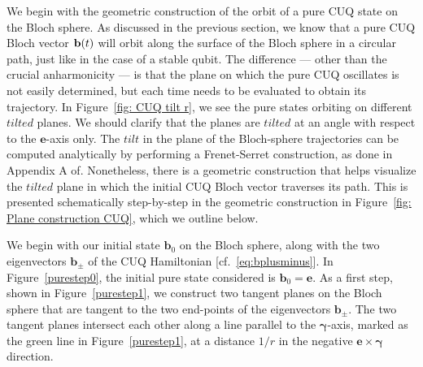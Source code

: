 \documentclass[12pt,a4paper]{article}
\begin{document}
We begin with the geometric construction of the orbit of a pure CUQ state on the Bloch sphere. As discussed in the previous section, we know that a pure CUQ Bloch vector ${\bf b}(t)$ will orbit along the surface of the Bloch sphere in a circular path, just like in the case of a stable qubit. The difference — other than the crucial anharmonicity — is that the plane on which the pure CUQ oscillates is not easily determined, but each time needs to be evaluated to obtain its trajectory. In Figure~\ref{fig: CUQ tilt r}, we see the pure states orbiting on different $\textit{tilted}$ planes. We should clarify that the planes are $\textit{tilted}$ at an angle with respect to the $\mathbf{e}$-axis only. The $\textit{tilt}$ in the plane of the Bloch-sphere trajectories can be computed analytically by performing a Frenet-Serret construction, as done in Appendix A of\cite{Karamitros:2025azy}. Nonetheless, there is a geometric construction that helps visualize the $\textit{tilted}$ plane in which the initial CUQ  Bloch vector traverses its path. This is presented schematically step-by-step in the geometric construction in Figure~\ref{fig: Plane construction CUQ}, which we outline below.

We begin with our initial state $\mathbf{b}_0$ on the Bloch sphere, along with the two eigenvectors $\mathbf{b}_\pm$ of the CUQ Hamiltonian [cf.~\eqref{eq:bplusminus}]. In Figure~\ref{purestep0}, the initial pure state considered is $\mathbf{b}_0 = \mathbf{e}$. As a first step, shown in Figure~\ref{purestep1}, we construct two tangent planes on the Bloch sphere that are tangent to the two end-points of the eigenvectors $\mathbf{b}_{\pm}$. The two tangent planes intersect each other along a line parallel to the $\boldsymbol{\gamma}$-axis, marked as the green line in Figure~\ref{purestep1}, at a distance $1/r$ in the negative $\mathbf{e}\times\boldsymbol{\gamma}$ direction. 
\end{document}
